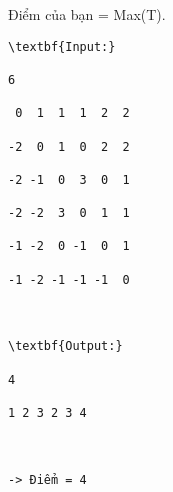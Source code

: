 Điểm của bạn = Max(T).
\begin{verbatim}
\textbf{Input:}

6

 0  1  1  1  2  2

-2  0  1  0  2  2

-2 -1  0  3  0  1

-2 -2  3  0  1  1

-1 -2  0 -1  0  1

-1 -2 -1 -1 -1  0



\textbf{Output:}

4

1 2 3 2 3 4 



-> Điểm = 4

\end{verbatim}